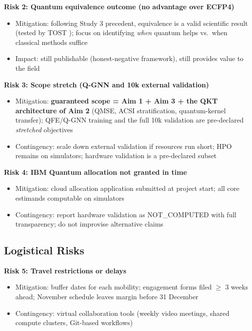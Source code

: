 \documentclass[11pt,a4paper]{article}
\begin{document}
\textbf{Risk 2: Quantum equivalence outcome (no advantage over ECFP4)}
\begin{itemize}
    \item Mitigation: following Study 3 precedent, equivalence is a valid scientific result (tested by TOST \cite{lakens2017}); focus on identifying \textit{when} quantum helps vs.\ when classical methods suffice
    \item Impact: still publishable (honest-negative framework), still provides value to the field
\end{itemize}

\textbf{Risk 3: Scope stretch (Q-GNN and 10k external validation)}
\begin{itemize}
    \item Mitigation: \textbf{guaranteed scope = Aim 1 + Aim 3 + the QKT architecture of Aim 2} (QMSE, ACSI stratification, quantum-kernel transfer); QFE/Q-GNN training and the full 10k validation are pre-declared \textit{stretched} objectives
    \item Contingency: scale down external validation if resources run short; HPO remains on simulators; hardware validation is a pre-declared subset
\end{itemize}

\textbf{Risk 4: IBM Quantum allocation not granted in time}
\begin{itemize}
    \item Mitigation: cloud allocation application submitted at project start; all core estimands computable on simulators
    \item Contingency: report hardware validation as NOT\_COMPUTED with full transparency; do not improvise alternative claims
\end{itemize}

\subsection{Logistical Risks}

\textbf{Risk 5: Travel restrictions or delays}
\begin{itemize}
    \item Mitigation: buffer dates for each mobility; engagement forms filed $\geq$ 3 weeks ahead; November schedule leaves margin before 31 December
    \item Contingency: virtual collaboration tools (weekly video meetings, shared compute clusters, Git-based workflows)
\end{itemize}
\end{document}
